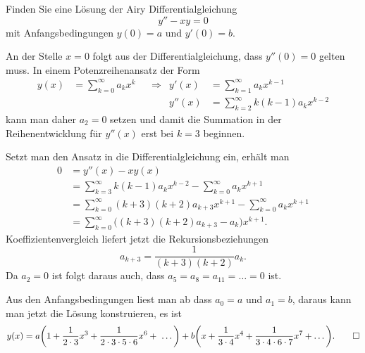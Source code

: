 Finden Sie eine Lösung der Airy Differentialgleichung
%
\[
y''-xy=0
\]
mit Anfangsbedingungen $y(0)=a$ und $y'(0)=b$.

\begin{loesung}
An der Stelle $x=0$ folgt aus der Differentialgleichung, dass $y''(0)=0$
gelten muss.
In einem Potenzreihenansatz der Form
\begin{align*}
y(x)
&=
\sum_{k=0}^\infty a_kx^k
&&\Rightarrow&
y'(x)
&=
\sum_{k=1}^\infty a_kx^{k-1}
\\
&&&&
y''(x)
&=
\sum_{k=2}^\infty k(k-1)a_kx^{k-2}
\end{align*}
kann man daher $a_2=0$ setzen und damit die Summation in der
Reihenentwicklung für $y''(x)$ erst bei $k=3$ beginnen.

Setzt man den Ansatz in die Differentialgleichung ein, erhält man
\begin{align*}
0
&=
y''(x)-xy(x)
\\
&=
\sum_{k=3}^\infty k(k-1)a_kx^{k-2}
-
\sum_{k=0}^\infty a_kx^{k+1}
\\
&=
\sum_{k=0}^\infty (k+3)(k+2)a_{k+3}x^{k+1}
-
\sum_{k=0}^\infty a_{k}x^{k+1}
\\
&=
\sum_{k=0}^\infty \bigl((k+3)(k+2)a_{k+3}-a_{k}\bigr)x^{k+1}.
\end{align*}
Koeffizientenvergleich liefert jetzt die Rekursionsbeziehungen
\[
a_{k+3} = \frac1{(k+3)(k+2)} {a_k}.
\]
Da $a_2=0$ ist folgt daraus auch, dass $a_5=a_8=a_{11}=\dots=0$ ist.

Aus den Anfangsbedingungen liest man ab dass $a_0=a$ und $a_1=b$, daraus
kann man jetzt die Lösung konstruieren, es ist
\[
y(x)
=
a\biggl(1+\frac{1}{2\cdot 3}x^3 + \frac{1}{2\cdot3\cdot5\cdot 6}x^6 + \dots\biggr)
+
b\biggl(x+\frac{1}{3\cdot 4}x^4 + \frac{1}{3\cdot 4\cdot 6\cdot 7}x^7+\dots\biggr).
\qedhere
\]
\end{loesung}
